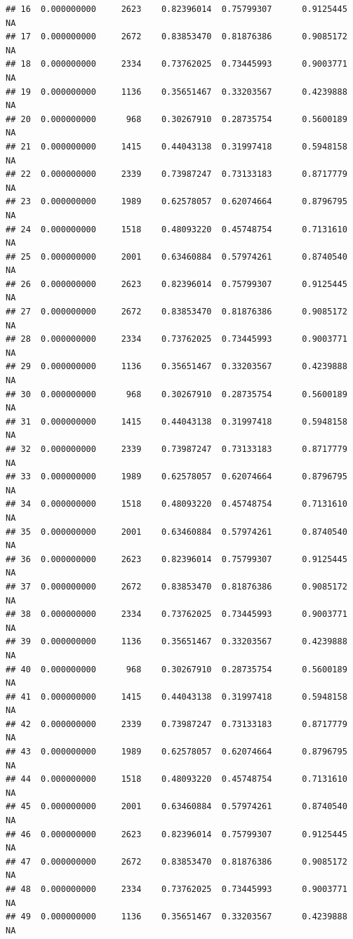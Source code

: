 \documentclass[
]{article}
\begin{document}
\begin{verbatim}
## 16  0.000000000     2623    0.82396014  0.75799307      0.9125445      NA
## 17  0.000000000     2672    0.83853470  0.81876386      0.9085172      NA
## 18  0.000000000     2334    0.73762025  0.73445993      0.9003771      NA
## 19  0.000000000     1136    0.35651467  0.33203567      0.4239888      NA
## 20  0.000000000      968    0.30267910  0.28735754      0.5600189      NA
## 21  0.000000000     1415    0.44043138  0.31997418      0.5948158      NA
## 22  0.000000000     2339    0.73987247  0.73133183      0.8717779      NA
## 23  0.000000000     1989    0.62578057  0.62074664      0.8796795      NA
## 24  0.000000000     1518    0.48093220  0.45748754      0.7131610      NA
## 25  0.000000000     2001    0.63460884  0.57974261      0.8740540      NA
## 26  0.000000000     2623    0.82396014  0.75799307      0.9125445      NA
## 27  0.000000000     2672    0.83853470  0.81876386      0.9085172      NA
## 28  0.000000000     2334    0.73762025  0.73445993      0.9003771      NA
## 29  0.000000000     1136    0.35651467  0.33203567      0.4239888      NA
## 30  0.000000000      968    0.30267910  0.28735754      0.5600189      NA
## 31  0.000000000     1415    0.44043138  0.31997418      0.5948158      NA
## 32  0.000000000     2339    0.73987247  0.73133183      0.8717779      NA
## 33  0.000000000     1989    0.62578057  0.62074664      0.8796795      NA
## 34  0.000000000     1518    0.48093220  0.45748754      0.7131610      NA
## 35  0.000000000     2001    0.63460884  0.57974261      0.8740540      NA
## 36  0.000000000     2623    0.82396014  0.75799307      0.9125445      NA
## 37  0.000000000     2672    0.83853470  0.81876386      0.9085172      NA
## 38  0.000000000     2334    0.73762025  0.73445993      0.9003771      NA
## 39  0.000000000     1136    0.35651467  0.33203567      0.4239888      NA
## 40  0.000000000      968    0.30267910  0.28735754      0.5600189      NA
## 41  0.000000000     1415    0.44043138  0.31997418      0.5948158      NA
## 42  0.000000000     2339    0.73987247  0.73133183      0.8717779      NA
## 43  0.000000000     1989    0.62578057  0.62074664      0.8796795      NA
## 44  0.000000000     1518    0.48093220  0.45748754      0.7131610      NA
## 45  0.000000000     2001    0.63460884  0.57974261      0.8740540      NA
## 46  0.000000000     2623    0.82396014  0.75799307      0.9125445      NA
## 47  0.000000000     2672    0.83853470  0.81876386      0.9085172      NA
## 48  0.000000000     2334    0.73762025  0.73445993      0.9003771      NA
## 49  0.000000000     1136    0.35651467  0.33203567      0.4239888      NA

\end{verbatim}
\end{document}
